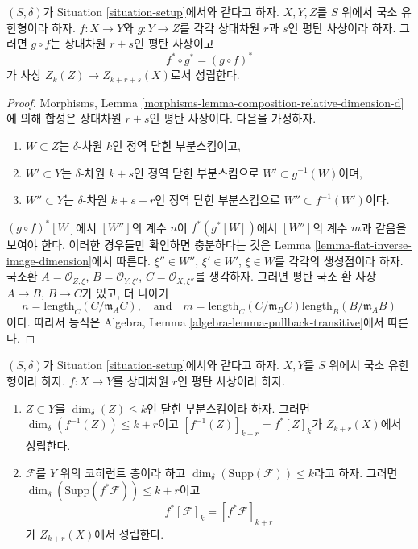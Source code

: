 \begin{lemma}
\label{lemma-compose-flat-pullback}
$(S, \delta)$가 Situation \ref{situation-setup}에서와 같다고 하자.
$X, Y, Z$를 $S$ 위에서 국소 유한형이라 하자.
$f : X \to Y$와 $g : Y \to Z$를 각각 상대차원 $r$과 $s$인 평탄
사상이라 하자. 그러면 $g \circ f$는 상대차원 $r + s$인 평탄 사상이고
$$
f^* \circ g^* = (g \circ f)^*
$$
가 사상 $Z_k(Z) \to Z_{k + r + s}(X)$로서 성립한다.
\end{lemma}

\begin{proof}
Morphisms, Lemma \ref{morphisms-lemma-composition-relative-dimension-d}에
의해 합성은 상대차원 $r + s$인 평탄 사상이다. 다음을 가정하자.
\begin{enumerate}
\item $W \subset Z$는 $\delta$-차원 $k$인 정역 닫힌 부분스킴이고,
\item $W' \subset Y$는 $\delta$-차원 $k + s$인 정역 닫힌 부분스킴으로
$W' \subset g^{-1}(W)$이며,
\item $W'' \subset Y$는 $\delta$-차원 $k + s + r$인 정역 닫힌
부분스킴으로 $W'' \subset f^{-1}(W')$이다.
\end{enumerate}
$(g \circ f)^*[W]$에서 $[W'']$의 계수 $n$이 $f^*(g^*[W])$에서
$[W'']$의 계수 $m$과 같음을 보여야 한다. 이러한 경우들만 확인하면
충분하다는 것은 Lemma \ref{lemma-flat-inverse-image-dimension}에서 따른다.
$\xi'' \in W''$, $\xi' \in W'$, $\xi \in W$를 각각의 생성점이라 하자.
국소환 $A = \mathcal{O}_{Z, \xi}$, $B = \mathcal{O}_{Y, \xi'}$,
$C = \mathcal{O}_{X, \xi''}$를 생각하자. 그러면 평탄 국소 환 사상
$A \to B$, $B \to C$가 있고, 더 나아가
$$
n = \text{length}_C(C/\mathfrak m_AC),
\quad
\text{and}
\quad
m = \text{length}_C(C/\mathfrak m_BC) \text{length}_B(B/\mathfrak m_AB)
$$
이다. 따라서 등식은 Algebra, Lemma
\ref{algebra-lemma-pullback-transitive}에서 따른다.
\end{proof}

\begin{lemma}
\label{lemma-pullback-coherent}
$(S, \delta)$가 Situation \ref{situation-setup}에서와 같다고 하자.
$X, Y$를 $S$ 위에서 국소 유한형이라 하자.
$f : X \to Y$를 상대차원 $r$인 평탄 사상이라 하자.
\begin{enumerate}
\item $Z \subset Y$를 $\dim_\delta(Z) \leq k$인 닫힌 부분스킴이라 하자.
그러면 $\dim_\delta(f^{-1}(Z)) \leq k + r$이고
$[f^{-1}(Z)]_{k + r} = f^*[Z]_k$가 $Z_{k + r}(X)$에서 성립한다.
\item $\mathcal{F}$를 $Y$ 위의 코히런트 층이라 하고
$\dim_\delta(\text{Supp}(\mathcal{F})) \leq k$라고 하자. 그러면
$\dim_\delta(\text{Supp}(f^*\mathcal{F})) \leq k + r$이고
$$
f^*[{\mathcal F}]_k = [f^*{\mathcal F}]_{k+r}
$$
가 $Z_{k + r}(X)$에서 성립한다.
\end{enumerate}
\end{lemma}


